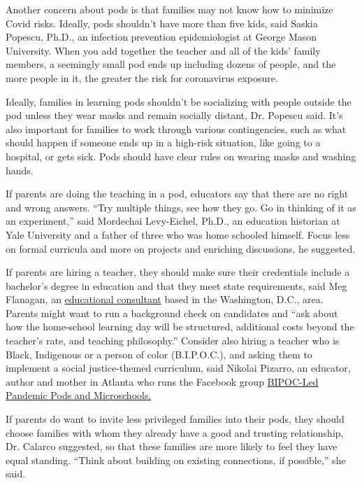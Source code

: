 Another concern about pods is that families may not know how to minimize
Covid risks. Ideally, pods shouldn't have more than five kids, said
Saskia Popescu, Ph.D., an infection prevention epidemiologist at George
Mason University. When you add together the teacher and all of the kids'
family members, a seemingly small pod ends up including dozens of
people, and the more people in it, the greater the risk for coronavirus
exposure.

Ideally, families in learning pods shouldn't be socializing with people
outside the pod unless they wear masks and remain socially distant, Dr.
Popescu said. It's also important for families to work through various
contingencies, such as what should happen if someone ends up in a
high-risk situation, like going to a hospital, or gets sick. Pods should
have clear rules on wearing masks and washing hands.

If parents are doing the teaching in a pod, educators say that there are
no right and wrong answers. ``Try multiple things, see how they go. Go
in thinking of it as an experiment,'' said Mordechai Levy-Eichel, Ph.D.,
an education historian at Yale University and a father of three who was
home schooled himself. Focus less on formal curricula and more on
projects and enriching discussions, he suggested.

If parents are hiring a teacher, they should make sure their credentials
include a bachelor's degree in education and that they meet state
requirements, said Meg Flanagan, an
\href{http://megflanagan.com/}{educational consultant} based in the
Washington, D.C., area. Parents might want to run a background check on
candidates and ``ask about how the home-school learning day will be
structured, additional costs beyond the teacher's rate, and teaching
philosophy.'' Consider also hiring a teacher who is Black, Indigenous or
a person of color (B.I.P.O.C.), and asking them to implement a social
justice-themed curriculum, said Nikolai Pizarro, an educator, author and
mother in Atlanta who runs the Facebook group
\href{https://www.facebookcorewwwi.onion/groups/876843739507884/?ref=share}{BIPOC-Led
Pandemic Pods and Microschools.}

If parents do want to invite less privileged families into their pods,
they should choose families with whom they already have a good and
trusting relationship, Dr. Calarco suggested, so that these families are
more likely to feel they have equal standing. ``Think about building on
existing connections, if possible,'' she said.

